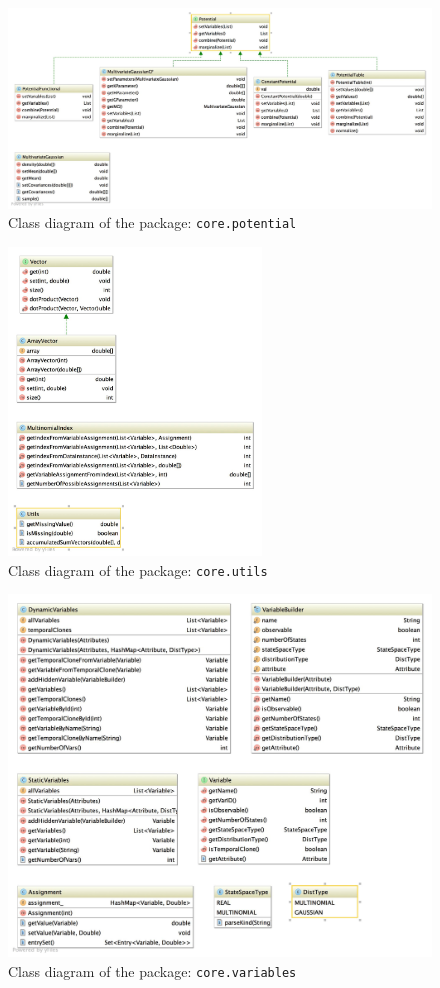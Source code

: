 \begin{figure}[h!]
  \caption{Class diagram of the package: \texttt{core.potential}}
  \centering
    \includegraphics[width=\textwidth]{ClassDiagrams/core_potential.jpg}
\end{figure}


\begin{figure}[h!]
  \caption{Class diagram of the package: \texttt{core.utils}}
  \centering
    \includegraphics[width=0.6\textwidth]{ClassDiagrams/core_utils.jpg}
\end{figure}


\begin{figure}[h!]
  \caption{Class diagram of the package: \texttt{core.variables}}
  \centering
    \includegraphics[width=\textwidth]{ClassDiagrams/core_variables.jpg}
\end{figure}


